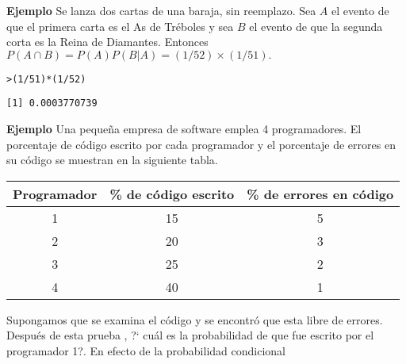 \documentclass{article}\usepackage[]{graphicx}\usepackage[]{color}
\makeatletter
\newcommand{\hlnum}[1]{\textcolor[rgb]{0.686,0.059,0.569}{#1}}%
\newcommand{\hlopt}[1]{\textcolor[rgb]{0,0,0}{#1}}%
\newcommand{\hlstd}[1]{\textcolor[rgb]{0.345,0.345,0.345}{#1}}%
\newenvironment{kframe}{%
 \def\at@end@of@kframe{}%
 \ifinner\ifhmode%
  \def\at@end@of@kframe{\end{minipage}}%
  \begin{minipage}{\columnwidth}%
 \fi\fi%
 \def\FrameCommand##1{\hskip\@totalleftmargin \hskip-\fboxsep
 \colorbox{shadecolor}{##1}\hskip-\fboxsep
     \hskip-\linewidth \hskip-\@totalleftmargin \hskip\columnwidth}%
 \MakeFramed {\advance\hsize-\width
   \@totalleftmargin\z@ \linewidth\hsize
   \@setminipage}}%
 {\par\unskip\endMakeFramed%
 \at@end@of@kframe}
\newenvironment{knitrout}{}{} %
\makeatother
\begin{document}
\vspace{0.2cm}

\textbf{Ejemplo} Se lanza  dos cartas de una baraja, sin reemplazo. Sea $A$ el evento de que el primera carta  es el As de Tr\'eboles y sea $B$ el evento de que la segunda corta  es la Reina de Diamantes. Entonces $P(A \cap B) = P(A)P(B|A) = (1/52) \times (1/51).$

\begin{knitrout}
\color{fgcolor}\begin{kframe}
\begin{alltt}
\hlstd{> }\hlstd{(}\hlnum{1}\hlopt{/}\hlnum{51}\hlstd{)} \hlopt{*} \hlstd{(}\hlnum{1}\hlopt{/}\hlnum{52}\hlstd{)}
\end{alltt}
\begin{verbatim}
[1] 0.0003770739
\end{verbatim}
\end{kframe}
\end{knitrout}


\newpage 

\textbf{Ejemplo}  Una peque\~na empresa de software emplea 4 programadores. El porcentaje de c\'odigo escrito por cada programador y el porcentaje de errores en su c\'odigo se muestran en la siguiente tabla.

\begin{table}[h]
\begin{center}
\begin{tabular}{|c|c|c|}
\hline
Programador & \% de c\'odigo escrito & \% de errores en c\'odigo \\ \hline
1           & 15                   & 5                       \\ \hline
2           & 20                   & 3                       \\ \hline
3           & 25                   & 2                       \\ \hline
4           & 40                   & 1                       \\ \hline
\end{tabular}
\end{center}
\end{table}

\vspace{0.3cm}


Supongamos que se examina el c\'odigo y se encontr\'o que esta libre de errores. Despu\'es de esta prueba , ?` cu\'al es la probabilidad de que fue escrito por el programador 1?.  En efecto de la probabilidad condicional
\end{document}
